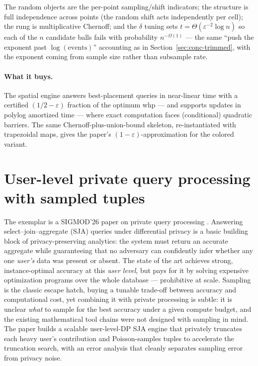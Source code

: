 The random objects are the per-point sampling/shift indicators; the structure is full
independence across points (the random shift acts independently per cell); the rung is
multiplicative Chernoff; and the $\delta$ tuning sets $t = \Theta(\varepsilon^{-2}
\log n)$ so each of the $n$ candidate balls fails with probability $n^{-\Omega(1)}$ ---
the same ``push the exponent past $\log(\text{events})$'' accounting as in
Section~\ref{sec:conc-trimmed}, with the exponent coming from sample size rather than
subsample rate.

\paragraph{What it buys.}
The spatial engine answers best-placement queries in near-linear time with a certified
$(1/2-\varepsilon)$ fraction of the optimum whp --- and supports updates in polylog
amortized time --- where exact computation faces (conditional) quadratic barriers. The
same Chernoff-plus-union-bound skeleton, re-instantiated with trapezoidal maps, gives the
paper's $(1-\varepsilon)$-approximation for the colored variant.

\section{User-level private query processing with sampled tuples}
\label{sec:conc-s4s}

The exemplar is a SIGMOD'26 paper on private query processing \cite{sigmod26-079}.
Answering select--join--aggregate (SJA) queries under differential privacy is a basic
building block of privacy-preserving analytics: the system must return an accurate
aggregate while guaranteeing that no adversary can confidently infer whether any one
\emph{user's} data was present or absent. The state of the art achieves strong,
instance-optimal accuracy at this \emph{user level}, but pays for it by solving
expensive optimization programs over the whole database --- prohibitive at scale.
Sampling is the classic escape hatch, buying a tunable trade-off between accuracy and
computational cost, yet combining it with private processing is subtle: it is unclear
\emph{what} to sample for the best accuracy under a given compute budget, and the
existing mathematical tool chains were not designed with sampling in mind. The paper
builds a scalable user-level-DP SJA engine that privately truncates each heavy user's
contribution and Poisson-samples tuples to accelerate the truncation search, with an
error analysis that cleanly separates sampling error from privacy noise.

